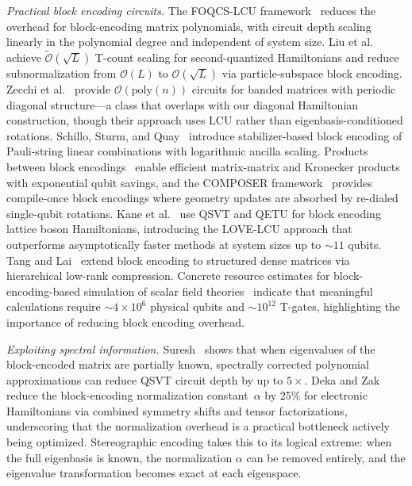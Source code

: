 \emph{Practical block encoding circuits.}
The FOQCS-LCU framework~\cite{NibbiEtAl2026} reduces the
overhead for block-encoding matrix polynomials, with circuit
depth scaling linearly in the polynomial degree and independent
of system size.  Liu et al.~\cite{LiuZhuLowLinYang2025}
achieve $\tilde{\mathcal{O}}(\sqrt{L})$ T-count scaling for
second-quantized Hamiltonians and reduce subnormalization from
$\mathcal{O}(L)$ to $\mathcal{O}(\sqrt{L})$ via
particle-subspace block encoding.
Zecchi et al.~\cite{ZecchiEtAl2026} provide
$\mathcal{O}(\mathrm{poly}(n))$ circuits for banded matrices
with periodic diagonal structure---a class that overlaps with
our diagonal Hamiltonian construction, though their approach
uses LCU rather than eigenbasis-conditioned rotations.
Schillo, Sturm, and Quay~\cite{SchilloSturmQuay2026} introduce
stabilizer-based block encoding of Pauli-string linear
combinations with logarithmic ancilla scaling.
Products between block encodings~\cite{DongLiXue2025} enable
efficient matrix-matrix and Kronecker products with exponential
qubit savings, and the COMPOSER
framework~\cite{PengLiuKowalski2026} provides compile-once
block encodings where geometry updates are absorbed by re-dialed
single-qubit rotations.
Kane et al.~\cite{KaneEtAl2025} use QSVT and
QETU for block encoding lattice boson Hamiltonians, introducing
the LOVE-LCU approach that outperforms asymptotically faster
methods at system sizes up to $\sim 11$ qubits.  Tang and
Lai~\cite{TangLai2026} extend block encoding to structured
dense matrices via hierarchical low-rank compression.
Concrete resource estimates for block-encoding-based simulation
of scalar field theories~\cite{HardyEtAl2024} indicate that
meaningful calculations require $\sim 4 \times 10^6$ physical
qubits and $\sim 10^{12}$ T-gates, highlighting the importance
of reducing block encoding overhead.

\emph{Exploiting spectral information.}
Suresh~\cite{Suresh2026} shows that when eigenvalues of the
block-encoded matrix are partially known, spectrally corrected
polynomial approximations can reduce QSVT circuit depth by up
to $5\times$.  Deka and Zak~\cite{DekaZak2025} reduce the
block-encoding normalization constant~$\alpha$ by 25\% for
electronic Hamiltonians via combined symmetry shifts and tensor
factorizations, underscoring that the normalization overhead is
a practical bottleneck actively being optimized.
Stereographic encoding takes this to its logical
extreme: when the full eigenbasis is known, the normalization
$\alpha$ can be removed entirely, and the eigenvalue
transformation becomes exact at each eigenspace.

